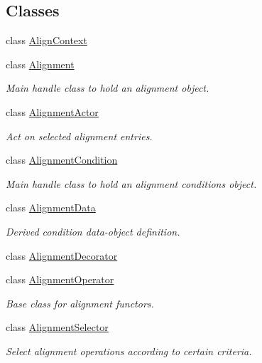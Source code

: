\subsection*{Classes}
\begin{DoxyCompactItemize}
\item 
class \hyperlink{class_d_d4hep_1_1_alignments_1_1_align_context}{Align\+Context}
\item 
class \hyperlink{class_d_d4hep_1_1_alignments_1_1_alignment}{Alignment}
\begin{DoxyCompactList}\small\item\em Main handle class to hold an alignment object. \end{DoxyCompactList}\item 
class \hyperlink{class_d_d4hep_1_1_alignments_1_1_alignment_actor}{Alignment\+Actor}
\begin{DoxyCompactList}\small\item\em Act on selected alignment entries. \end{DoxyCompactList}\item 
class \hyperlink{class_d_d4hep_1_1_alignments_1_1_alignment_condition}{Alignment\+Condition}
\begin{DoxyCompactList}\small\item\em Main handle class to hold an alignment conditions object. \end{DoxyCompactList}\item 
class \hyperlink{class_d_d4hep_1_1_alignments_1_1_alignment_data}{Alignment\+Data}
\begin{DoxyCompactList}\small\item\em Derived condition data-\/object definition. \end{DoxyCompactList}\item 
class \hyperlink{class_d_d4hep_1_1_alignments_1_1_alignment_decorator}{Alignment\+Decorator}
\item 
class \hyperlink{class_d_d4hep_1_1_alignments_1_1_alignment_operator}{Alignment\+Operator}
\begin{DoxyCompactList}\small\item\em Base class for alignment functors. \end{DoxyCompactList}\item 
class \hyperlink{class_d_d4hep_1_1_alignments_1_1_alignment_selector}{Alignment\+Selector}
\begin{DoxyCompactList}\small\item\em Select alignment operations according to certain criteria. \end{DoxyCompactList}\item 

\end{DoxyCompactItemize}
